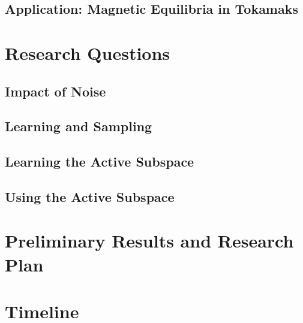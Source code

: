 \documentclass{amsart}
\begin{document}
\subsection{Application: Magnetic Equilibria in Tokamaks}






\section{Research Questions}


\subsection{Impact of Noise}

\subsection{Learning and Sampling}

\subsection{Learning the Active Subspace}

\subsection{Using the Active Subspace}





\section{Preliminary Results and Research Plan}





\section{Timeline}










\end{document}
